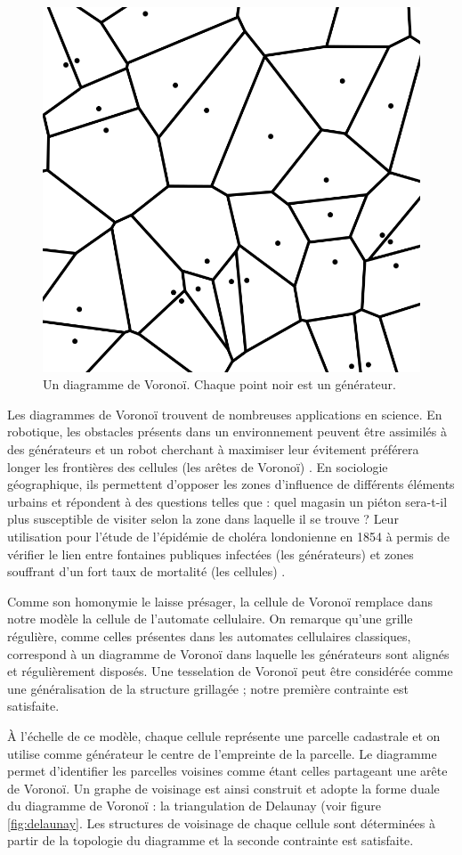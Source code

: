 \documentclass[12pt]{article}
\begin{document}
\begin{figure}[!ht]
  \centering
  \includegraphics[width=0.7\linewidth]{images/voronoi.png}
  \caption{Un diagramme de Voronoï. Chaque point noir est un générateur.}
  \label{fig:voronoi}
\end{figure}

Les diagrammes de Voronoï trouvent de nombreuses applications en
science. En robotique, les obstacles présents dans un environnement
peuvent être assimilés à des générateurs et un robot cherchant à
maximiser leur évitement préférera longer les frontières des cellules
(les arêtes de Voronoï) \cite{Garrido2006}. En sociologie
géographique, ils permettent d'opposer les zones d'influence de
différents éléments urbains et répondent à des questions telles que :
quel magasin un piéton sera-t-il plus susceptible de visiter selon la
zone dans laquelle il se trouve ? Leur utilisation pour l'étude de
l'épidémie de choléra londonienne en 1854 à permis de vérifier le lien
entre fontaines publiques infectées (les générateurs) et zones
souffrant d'un fort taux de mortalité (les cellules)
\cite{Thomas2010}.

Comme son homonymie le laisse présager, la cellule de Voronoï remplace
dans notre modèle la cellule de l'automate cellulaire. On remarque
qu'une grille régulière, comme celles présentes dans les automates
cellulaires classiques, correspond à un diagramme de Voronoï dans
laquelle les générateurs sont alignés et régulièrement disposés. Une
tesselation de Voronoï peut être considérée comme une généralisation
de la structure grillagée ; notre première contrainte est satisfaite.

À l'échelle de ce modèle, chaque cellule représente une parcelle
cadastrale et on utilise comme générateur le centre de l'empreinte de
la parcelle. Le diagramme permet d'identifier les parcelles voisines
comme étant celles partageant une arête de Voronoï. Un graphe de
voisinage est ainsi construit et adopte la forme duale du diagramme de
Voronoï : la triangulation de Delaunay (voir figure
\ref{fig:delaunay}. Les structures de voisinage de chaque cellule sont
déterminées à partir de la topologie du diagramme et la seconde
contrainte est satisfaite.
\end{document}
